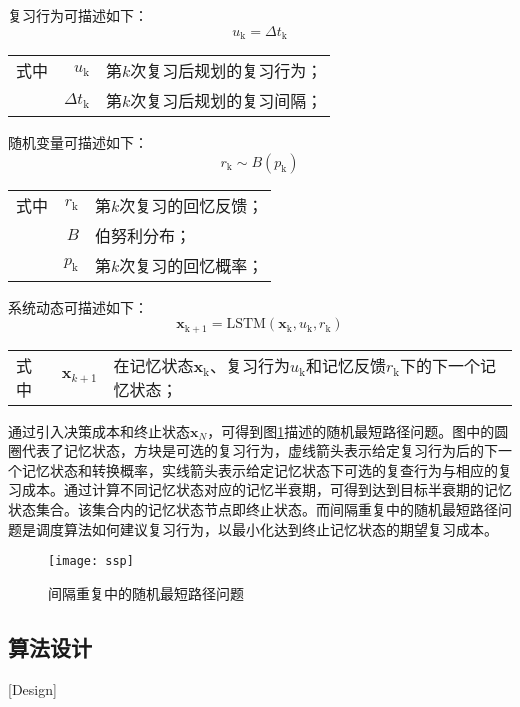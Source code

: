 复习行为可描述如下：
\begin{equation}
u_\mathrm{k}=\Delta t_\mathrm{k}
\end{equation}
\begin{tabularx}{\textwidth}{@{}l@{\quad}r@{———}X@{}}
    式中& $u_\mathrm{k}$ &第$k$次复习后规划的复习行为；\\
    &  $\Delta t_\mathrm{k}$ &第$k$次复习后规划的复习间隔；
\end{tabularx}\vspace{3.15bp}

随机变量可描述如下：
\begin{equation}
r_\mathrm{k} \sim B(p_\mathrm{k})
\end{equation}
\begin{tabularx}{\textwidth}{@{}l@{\quad}r@{———}X@{}}
    式中& $r_\mathrm{k}$ &第$k$次复习的回忆反馈；\\
    &  $B$ &伯努利分布；\\
    &  $p_\mathrm{k}$ &第$k$次复习的回忆概率；
\end{tabularx}\vspace{3.15bp}

系统动态可描述如下：
\begin{equation}
\bm x_\mathrm{k+1}=\mathrm{LSTM}(\bm x_\mathrm{k},u_\mathrm{k},r_\mathrm{k})
\end{equation}
\begin{tabularx}{\textwidth}{@{}l@{\quad}r@{———}X@{}}
    式中& $\bm x_{k+1}$ &在记忆状态$\bm x_\mathrm{k}$、复习行为$u_\mathrm{k}$和记忆反馈$r_\mathrm{k}$下的下一个记忆状态；
\end{tabularx}\vspace{3.15bp}

通过引入决策成本和终止状态$\bm x_N$，可得到图\ref{fig:ssp}描述的随机最短路径问题。图中的圆圈代表了记忆状态，方块是可选的复习行为，虚线箭头表示给定复习行为后的下一个记忆状态和转换概率，实线箭头表示给定记忆状态下可选的复查行为与相应的复习成本。通过计算不同记忆状态对应的记忆半衰期，可得到达到目标半衰期的记忆状态集合。该集合内的记忆状态节点即终止状态。而间隔重复中的随机最短路径问题是调度算法如何建议复习行为，以最小化达到终止记忆状态的期望复习成本。

\begin{figure}[htbp]
    \centering
    \texttt{[image: ssp]}
    \caption{间隔重复中的随机最短路径问题}
    \label{fig:ssp}
\end{figure}

\subsection{算法设计}[Design]

